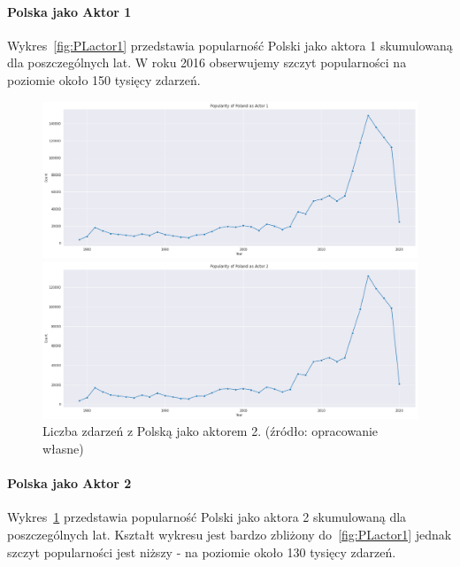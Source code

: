 \documentclass[11pt]{report}
\begin{document}
    \paragraph{Polska jako Aktor 1}
    Wykres~\ref{fig:PLactor1} przedstawia popularność Polski jako aktora 1 skumulowaną dla poszczególnych lat.
    W roku 2016 obserwujemy szczyt popularności na poziomie około 150 tysięcy zdarzeń.
    \begin{figure}[!htp]
        \centering
        \includegraphics[width=1 \textwidth]{fig/PL/PLactor1.png}
        \caption{Liczba zdarzeń z Polską jako aktorem 1. (źródło: opracowanie własne)}
        \label{fig:PLactor1}
        \includegraphics[width=1 \textwidth]{fig/PL/PLactor2.png}
        \caption{Liczba zdarzeń z Polską jako aktorem 2. (źródło: opracowanie własne)}
        \label{fig:PLactor2}
    \end{figure}

    \paragraph{Polska jako Aktor 2}
    Wykres~\ref{fig:PLactor2} przedstawia popularność Polski jako aktora 2 skumulowaną dla poszczególnych lat. Kształt wykresu jest bardzo zbliżony do~\ref{fig:PLactor1} jednak szczyt popularności jest niższy - na poziomie około 130 tysięcy zdarzeń.
\end{document}
